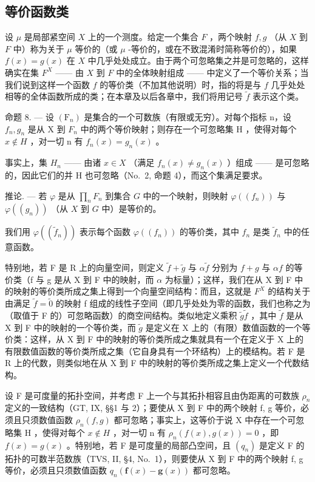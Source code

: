 \subsection{等价函数类}

设 \(\mu\) 是局部紧空间 \(X\) 上的一个测度。给定一个集合 \(F\) ，两个映射 \(f, g\) （从 \(X\) 到 \(F\) 中）称为关于 \(\mu\) 等价的（或 \(\mu\) -等价的，或在不致混淆时简称等价的），如果 \(f(x) = g(x)\) 在 \(X\) 中几乎处处成立。由于两个可忽略集之并是可忽略的，这样确实在集 \(F^X\) —— 由 \(X\) 到 \(F\) 中的全体映射组成 —— 中定义了一个等价关系；当我们说到这样一个函数 \(f\) 的等价类（不加其他说明）时，指的将是与 \(f\) 几乎处处相等的全体函数所成的类；在本章及以后各章中，我们将用记号 \(\widetilde{f}\) 表示这个类。

命题 8. --- 设 \((\mathrm{F}_{n})\) 是集合的一个可数族（有限或无穷）。对每个指标 n，设 \(f_{n}, g_{n}\) 是从 X 到 \(F_{n}\) 中的两个等价映射；则存在一个可忽略集 H ，使得对每个 \(x \notin H\) ，对一切 n 有 \(f_{n}(x) = g_{n}(x)\) 。

事实上，集 \(H_{n}\) —— 由诸 \(x \in X\) （满足 \(f_{n}(x) \neq g_{n}(x)\) ）组成 —— 是可忽略的，因此它们的并 H 也可忽略（No.~2, 命题 4），而这个集满足要求。

推论. --- 若 \(\varphi\) 是从 \(\prod_{n} F_n\) 到集合 \(G\) 中的一个映射，则映射 \(\varphi((f_n))\) 与 \(\varphi((g_n))\) （从 \(X\) 到 \(G\) 中）是等价的。

我们用 \(\varphi((\widetilde{f}_n))\) 表示每个函数 \(\varphi((f_n))\) 的等价类，其中 \(f_n\) 是类 \(\widetilde{f}_n\) 中的任意函数。

特别地，若 F 是 R 上的向量空间，则定义 \(\widetilde{f} + \widetilde{g}\) 与 \(\alpha\widetilde{f}\) 分别为 \(f + g\) 与 \(\alpha f\) 的等价类（f 与 g 是从 X 到 F 中的映射，而 \(\alpha\) 为标量）；这样，我们在从 X 到 F 中的映射的等价类所成之集上得到一个向量空间结构：而且，这就是 \(F^{X}\) 的结构关于由满足 \(\widetilde{f} = \widetilde{0}\) 的映射 f 组成的线性子空间（即几乎处处为零的函数，我们也称之为（取值于 F 的）可忽略函数）的商空间结构。类似地定义乘积 \(\widetilde{g}\widetilde{f}\) ，其中 \(\widetilde{f}\) 是从 X 到 F 中的映射的一个等价类，而 \(\widetilde{g}\) 是定义在 X 上的（有限）数值函数的一个等价类：这样，从 X 到 F 中的映射的等价类所成之集就具有一个在定义于 X 上的有限数值函数的等价类所成之集（它自身具有一个环结构）上的模结构。若 F 是 R 上的代数，则类似地在从 X 到 F 中的映射的等价类所成之集上定义一个代数结构。

设 F 是可度量的拓扑空间，并考虑 F 上一个与其拓扑相容且由伪距离的可数族 \(\rho_{n}\) 定义的一致结构（GT, IX, §§1 与 2）；要使从 X 到 F 中的两个映射 f, g 等价，必须且只须数值函数 \(\rho_{n}(f,g)\) 都可忽略；事实上，这等价于说 X 中存在一个可忽略集 H ，使得对每个 \(x\notin H\) ，对一切 n 有 \(\rho_{n}(f(x),g(x))=0\) ，即 \(f(x)=g(x)\) 。特别地，若 F 是可度量的局部凸空间，且 \((q_{n})\) 是定义 F 的拓扑的可数半范数族（TVS, II, §4, No.~1），则要使从 X 到 F 中的两个映射 f, g 等价，必须且只须数值函数 \(q_{n}(\mathbf{f}(x)-\mathbf{g}(x))\) 都可忽略。

